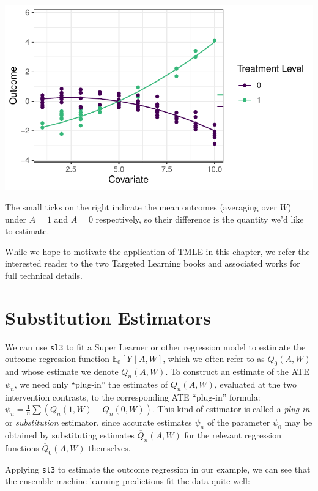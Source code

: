 \documentclass[12pt, krantz2,]{krantz}
\newcommand{\passthrough}[1]{#1}
\theoremstyle{definition}
\theoremstyle{definition}
\theoremstyle{definition}
\newcommand{\1}{\mathbbm{1}}
\begin{document}
\begin{center}\includegraphics[width=0.8\linewidth]{img/misc/tmle_sim/schematic_1_truedgd} \end{center}

The small ticks on the right indicate the mean outcomes (averaging over \(W\))
under \(A=1\) and \(A=0\) respectively, so their difference is the quantity we'd
like to estimate.

While we hope to motivate the application of TMLE in this chapter, we refer the
interested reader to the two Targeted Learning books and associated works for
full technical details.

\hypertarget{substitution-est}{%
\section{Substitution Estimators}\label{substitution-est}}

We can use \passthrough{\lstinline!sl3!} to fit a Super Learner or other regression model to estimate
the outcome regression function \(\mathbb{E}_0[Y \mid A,W]\), which we often refer
to as \(\overline{Q}_0(A,W)\) and whose estimate we denote \(\overline{Q}_n(A,W)\).
To construct an estimate of the ATE \(\psi_n\), we need only ``plug-in'' the
estimates of \(\overline{Q}_n(A,W)\), evaluated at the two intervention contrasts,
to the corresponding ATE ``plug-in'' formula:
\(\psi_n = \frac{1}{n}\sum(\overline{Q}_n(1,W)-\overline{Q}_n(0,W))\). This kind
of estimator is called a \emph{plug-in} or \emph{substitution} estimator, since accurate
estimates \(\psi_n\) of the parameter \(\psi_0\) may be obtained by substituting
estimates \(\overline{Q}_n(A,W)\) for the relevant regression functions
\(\overline{Q}_0(A,W)\) themselves.

Applying \passthrough{\lstinline!sl3!} to estimate the outcome regression in our example, we can see
that the ensemble machine learning predictions fit the data quite well:
\end{document}
